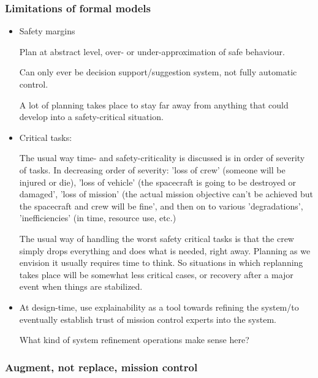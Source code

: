 \subsubsection{Limitations of formal models}

\begin{itemize}
\item Safety margins

    Plan at abstract level, over- or under-approximation of safe
    behaviour.
    
    Can only ever be decision support/suggestion system, not fully
    automatic control.
    
    A lot of planning takes place to stay far away from anything that
    could develop into a safety-critical situation.
    
\item Critical tasks:

    The usual way time- and safety-criticality is discussed is in
    order of severity of tasks.  In decreasing order of severity:
    'loss of crew' (someone will be injured or die), 'loss of vehicle'
    (the spacecraft is going to be destroyed or damaged', 'loss of
    mission' (the actual mission objective can't be achieved but the
    spacecraft and crew will be fine', and then on to various
    'degradations', 'inefficiencies' (in time, resource use, etc.)
    
    The usual way of handling the worst safety critical tasks is that
    the crew simply drops everything and does what is needed, right
    away.  Planning as we envision it usually requires time to think.
    So situations in which replanning takes place will be somewhat
    less critical cases, or recovery after a major event when things
    are stabilized.

\item At design-time, use explainability as a tool towards refining
  the system/to eventually establish trust of mission control experts
  into the system.

    What kind of system refinement operations make sense here?

\end{itemize}


\subsubsection{Augment, not replace, mission control}

